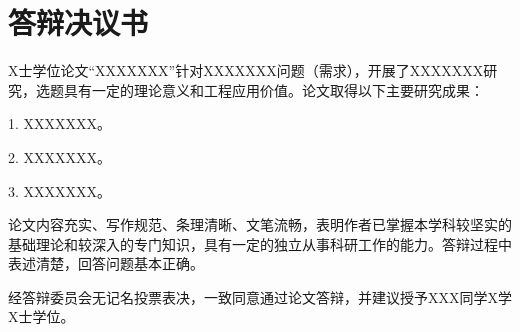 \ifdoctor
  \chapter*{答辩决议书}

X士学位论文“XXXXXXX”针对XXXXXXX问题（需求），开展了XXXXXXX研究，选题具有一定的理论意义和工程应用价值。论文取得以下主要研究成果：

1.	XXXXXXX。

2.	XXXXXXX。

3.	XXXXXXX。

论文内容充实、写作规范、条理清晰、文笔流畅，表明作者已掌握本学科较坚实的基础理论和较深入的专门知识，具有一定的独立从事科研工作的能力。答辩过程中表述清楚，回答问题基本正确。

经答辩委员会无记名投票表决，一致同意通过论文答辩，并建议授予XXX同学X学X士学位。





  
\fi
